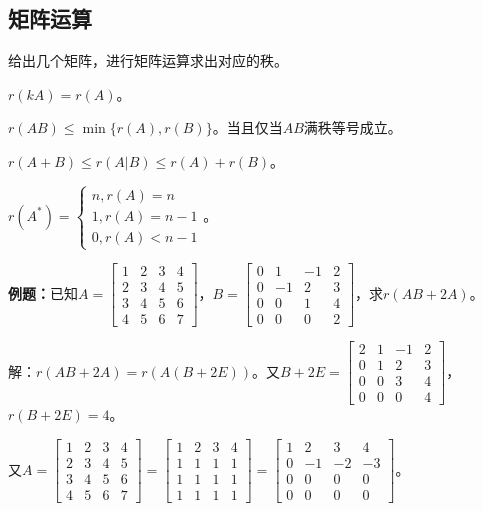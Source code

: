 \documentclass[UTF8, 12pt]{ctexart}
\begin{document}
\subsection{矩阵运算}

给出几个矩阵，进行矩阵运算求出对应的秩。

$r(kA)=r(A)$。

$r(AB)\leqslant\min\{r(A),r(B)\}$。当且仅当$AB$满秩等号成立。

$r(A+B)\leqslant r(A|B)\leqslant r(A)+r(B)$。

$r(A^*)=\left\{\begin{array}{l}
    n, r(A)=n \\
    1, r(A)=n-1 \\
    0, r(A)<n-1
\end{array}\right.$。

\textbf{例题：}已知$A=\left[\begin{array}{cccc}
    1 & 2 & 3 & 4 \\
    2 & 3 & 4 & 5 \\
    3 & 4 & 5 & 6 \\
    4 & 5 & 6 & 7
\end{array}\right]$，$B=\left[\begin{array}{cccc}
    0 & 1 & -1 & 2 \\
    0 & -1 & 2 & 3 \\
    0 & 0 & 1 & 4 \\
    0 & 0 & 0 & 2
\end{array}\right]$，求$r(AB+2A)$。

解：$r(AB+2A)=r(A(B+2E))$。又$B+2E=\left[\begin{array}{cccc}
    2 & 1 & -1 & 2 \\
    0 & 1 & 2 & 3 \\
    0 & 0 & 3 & 4 \\
    0 & 0 & 0 & 4
\end{array}\right]$，$r(B+2E)=4$。

又$A=\left[\begin{array}{cccc}
    1 & 2 & 3 & 4 \\
    2 & 3 & 4 & 5 \\
    3 & 4 & 5 & 6 \\
    4 & 5 & 6 & 7
\end{array}\right]=\left[\begin{array}{cccc}
    1 & 2 & 3 & 4 \\
    1 & 1 & 1 & 1 \\
    1 & 1 & 1 & 1 \\
    1 & 1 & 1 & 1
\end{array}\right]=\left[\begin{array}{cccc}
    1 & 2 & 3 & 4 \\
    0 & -1 & -2 & -3 \\
    0 & 0 & 0 & 0 \\
    0 & 0 & 0 & 0
\end{array}\right]$。\medskip
\end{document}
